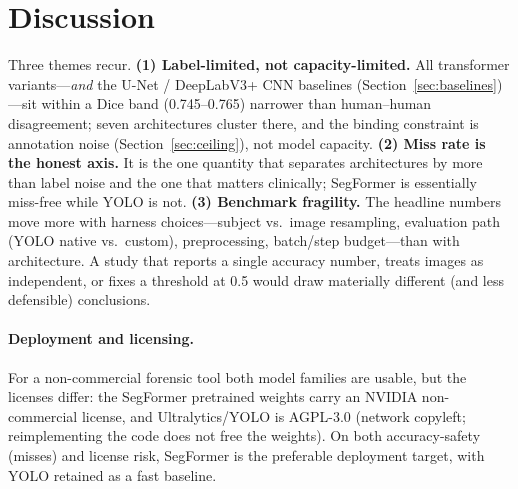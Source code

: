 \documentclass[11pt]{article}
\begin{document}
\section{Discussion}
Three themes recur. \textbf{(1) Label-limited, not capacity-limited.} All
transformer variants---\emph{and} the U-Net / DeepLabV3+ CNN baselines
(Section~\ref{sec:baselines})---sit within a Dice band (0.745--0.765) narrower than
human--human disagreement; seven architectures cluster there, and the binding constraint is
annotation noise (Section~\ref{sec:ceiling}), not model capacity. \textbf{(2) Miss rate is the honest axis.} It is the
one quantity that separates architectures by more than label noise and the one
that matters clinically; SegFormer is essentially miss-free while YOLO is not.
\textbf{(3) Benchmark fragility.} The headline numbers move more with
harness choices---subject vs.\ image resampling, evaluation path (YOLO native vs.\
custom), preprocessing, batch/step budget---than with architecture. A study that
reports a single accuracy number, treats images as independent, or fixes a
threshold at 0.5 would draw materially different (and less defensible)
conclusions.

\paragraph{Deployment and licensing.} For a non-commercial forensic tool both
model families are usable, but the licenses differ: the SegFormer pretrained
weights carry an NVIDIA non-commercial license, and Ultralytics/YOLO is AGPL-3.0
(network copyleft; reimplementing the code does not free the weights). On both
accuracy-safety (misses) and license risk, SegFormer is the preferable deployment
target, with YOLO retained as a fast baseline.

\end{document}
